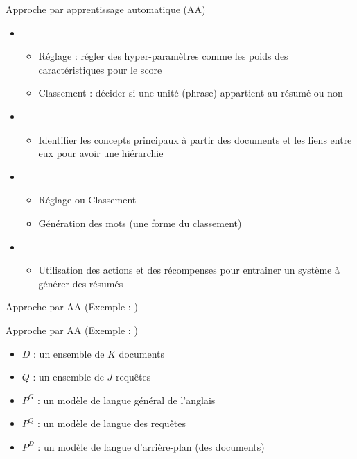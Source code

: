 \documentclass{KodeBook}
\begin{document}
Approche par apprentissage automatique (AA)

\begin{itemize}
	\item {}
	\begin{itemize}
		\item Réglage : régler des hyper-paramètres comme les poids des caractéristiques pour le score
		\item Classement : décider si une unité (phrase) appartient au résumé ou non
	\end{itemize}
	\item {}
	\begin{itemize}
		\item Identifier les concepts principaux à partir des documents et les liens entre eux pour avoir une hiérarchie
	\end{itemize}
	\item {}
	\begin{itemize}
		\item Réglage ou Classement
		\item Génération des mots (une forme du classement)
	\end{itemize}
	\item {}
	\begin{itemize}
		\item Utilisation des actions et des récompenses pour entrainer un système à générer des résumés
	\end{itemize}
\end{itemize}

Approche par AA (Exemple : \cite{2020-aries})

\begin{center}
\end{center}

Approche par AA (Exemple : \cite{06-daumeiii-marcu})

\begin{minipage}{.6\textwidth}
	\begin{itemize}
		\item $D$ : un ensemble de $K$ documents
		\item $Q$ : un ensemble de $J$ requêtes
		\item $P^G$ : un modèle de langue général de l'anglais 
		\item $P^Q$ : un modèle de langue des requêtes
		\item $P^D$ : un modèle de langue d'arrière-plan (des documents)
	\end{itemize}
\end{minipage}
\begin{minipage}{.38\textwidth}
\end{minipage}
\end{document}

